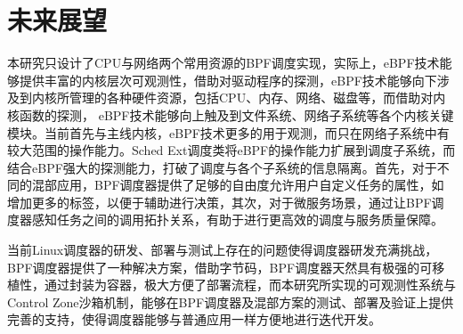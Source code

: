 \section{未来展望}

本研究只设计了CPU与网络两个常用资源的BPF调度实现，实际上，eBPF技术能够提供丰富的内核层次可观测性，借助对驱动程序的探测，eBPF技术能够向下涉及到内核所管理的各种硬件资源，包括CPU、内存、网络、磁盘等，而借助对内核函数的探测， eBPF技术能够向上触及到文件系统、网络子系统等各个内核关键模块。当前首先与主线内核，eBPF技术更多的用于观测，而只在网络子系统中有较大范围的操作能力。Sched Ext调度类将eBPF的操作能力扩展到调度子系统，而结合eBPF强大的探测能力，打破了调度与各个子系统的信息隔离。首先，对于不同的混部应用，BPF调度器提供了足够的自由度允许用户自定义任务的属性，如增加更多的标签，以便于辅助进行决策，其次，对于微服务场景，通过让BPF调度器感知任务之间的调用拓扑关系，有助于进行更高效的调度与服务质量保障。

当前Linux调度器的研发、部署与测试上存在的问题使得调度器研发充满挑战，BPF调度器提供了一种解决方案，借助字节码，BPF调度器天然具有极强的可移植性，通过封装为容器，极大方便了部署流程，而本研究所实现的可观测性系统与Control Zone沙箱机制，能够在BPF调度器及混部方案的测试、部署及验证上提供完善的支持，使得调度器能够与普通应用一样方便地进行迭代开发。